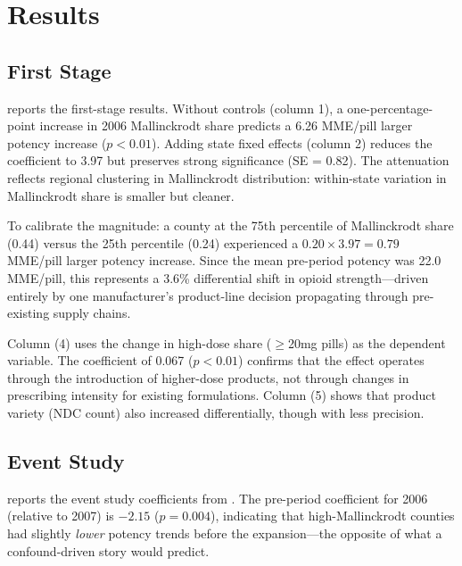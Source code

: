 \documentclass[12pt]{article}
\begin{document}
\section{Results}
\label{sec:results}

\subsection{First Stage}

 reports the first-stage results. Without controls (column 1), a one-percentage-point increase in 2006 Mallinckrodt share predicts a 6.26 MME/pill larger potency increase ($p < 0.01$). Adding state fixed effects (column 2) reduces the coefficient to 3.97 but preserves strong significance (SE = 0.82). The attenuation reflects regional clustering in Mallinckrodt distribution: within-state variation in Mallinckrodt share is smaller but cleaner.



To calibrate the magnitude: a county at the 75th percentile of Mallinckrodt share (0.44) versus the 25th percentile (0.24) experienced a $0.20 \times 3.97 = 0.79$ MME/pill larger potency increase. Since the mean pre-period potency was 22.0 MME/pill, this represents a 3.6\% differential shift in opioid strength---driven entirely by one manufacturer's product-line decision propagating through pre-existing supply chains.

Column (4) uses the change in high-dose share ($\geq$20mg pills) as the dependent variable. The coefficient of 0.067 ($p < 0.01$) confirms that the effect operates through the introduction of higher-dose products, not through changes in prescribing intensity for existing formulations. Column (5) shows that product variety (NDC count) also increased differentially, though with less precision.

\subsection{Event Study}

 reports the event study coefficients from . The pre-period coefficient for 2006 (relative to 2007) is $-2.15$ ($p = 0.004$), indicating that high-Mallinckrodt counties had slightly \emph{lower} potency trends before the expansion---the opposite of what a confound-driven story would predict.


\end{document}
